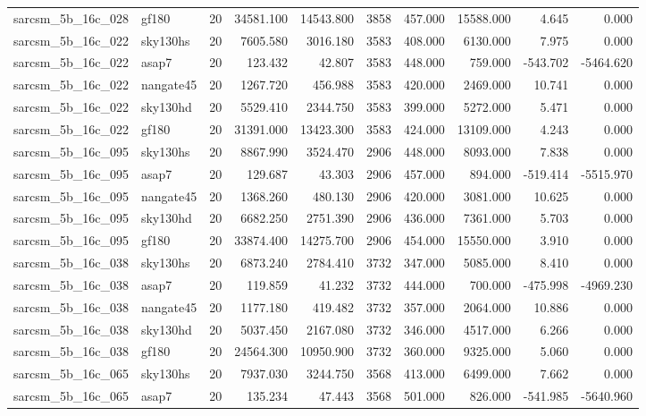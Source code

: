 \documentclass{article}
\begin{document}
\begin{longtable}{llrrrrrrrr}
sarcsm\_5b\_16c\_028 & gf180 & 20 & 34581.100 & 14543.800 & 3858 & 457.000 & 15588.000 & 4.645 & 0.000 \\
sarcsm\_5b\_16c\_022 & sky130hs & 20 & 7605.580 & 3016.180 & 3583 & 408.000 & 6130.000 & 7.975 & 0.000 \\
sarcsm\_5b\_16c\_022 & asap7 & 20 & 123.432 & 42.807 & 3583 & 448.000 & 759.000 & -543.702 & -5464.620 \\
sarcsm\_5b\_16c\_022 & nangate45 & 20 & 1267.720 & 456.988 & 3583 & 420.000 & 2469.000 & 10.741 & 0.000 \\
sarcsm\_5b\_16c\_022 & sky130hd & 20 & 5529.410 & 2344.750 & 3583 & 399.000 & 5272.000 & 5.471 & 0.000 \\
sarcsm\_5b\_16c\_022 & gf180 & 20 & 31391.000 & 13423.300 & 3583 & 424.000 & 13109.000 & 4.243 & 0.000 \\
sarcsm\_5b\_16c\_095 & sky130hs & 20 & 8867.990 & 3524.470 & 2906 & 448.000 & 8093.000 & 7.838 & 0.000 \\
sarcsm\_5b\_16c\_095 & asap7 & 20 & 129.687 & 43.303 & 2906 & 457.000 & 894.000 & -519.414 & -5515.970 \\
sarcsm\_5b\_16c\_095 & nangate45 & 20 & 1368.260 & 480.130 & 2906 & 420.000 & 3081.000 & 10.625 & 0.000 \\
sarcsm\_5b\_16c\_095 & sky130hd & 20 & 6682.250 & 2751.390 & 2906 & 436.000 & 7361.000 & 5.703 & 0.000 \\
sarcsm\_5b\_16c\_095 & gf180 & 20 & 33874.400 & 14275.700 & 2906 & 454.000 & 15550.000 & 3.910 & 0.000 \\
sarcsm\_5b\_16c\_038 & sky130hs & 20 & 6873.240 & 2784.410 & 3732 & 347.000 & 5085.000 & 8.410 & 0.000 \\
sarcsm\_5b\_16c\_038 & asap7 & 20 & 119.859 & 41.232 & 3732 & 444.000 & 700.000 & -475.998 & -4969.230 \\
sarcsm\_5b\_16c\_038 & nangate45 & 20 & 1177.180 & 419.482 & 3732 & 357.000 & 2064.000 & 10.886 & 0.000 \\
sarcsm\_5b\_16c\_038 & sky130hd & 20 & 5037.450 & 2167.080 & 3732 & 346.000 & 4517.000 & 6.266 & 0.000 \\
sarcsm\_5b\_16c\_038 & gf180 & 20 & 24564.300 & 10950.900 & 3732 & 360.000 & 9325.000 & 5.060 & 0.000 \\
sarcsm\_5b\_16c\_065 & sky130hs & 20 & 7937.030 & 3244.750 & 3568 & 413.000 & 6499.000 & 7.662 & 0.000 \\
sarcsm\_5b\_16c\_065 & asap7 & 20 & 135.234 & 47.443 & 3568 & 501.000 & 826.000 & -541.985 & -5640.960 \\

\end{longtable}
\end{document}
